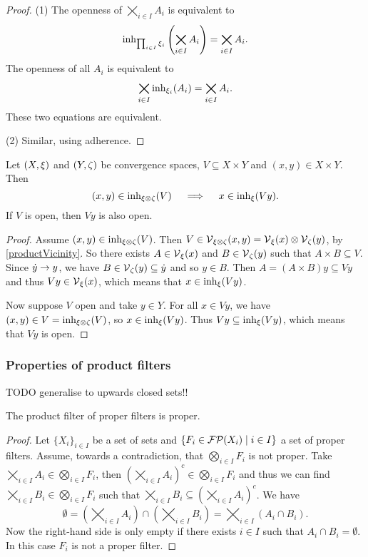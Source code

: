 \begin{proof}
(1) The openness of $\bigtimes_{i\in I}A_i$ is equivalent to 
\[\operatorname{inh}_{\prod_{i\in I}\xi_i}\left(\bigtimes_{i\in I}A_i\right) = \bigtimes_{i\in I}A_i. \]
The openness of all $A_i$ is equivalent to
\[\bigtimes_{i\in I}\operatorname{inh}_{\xi_i}(A_i) = \bigtimes_{i\in I}A_i. \]
These two equations are equivalent.

(2) Similar, using adherence.
\end{proof}

\begin{lemma} \label{sliceOpenSetOpen}
Let $\sSet{X,\xi}$ and $\sSet{Y,\zeta}$ be convergence spaces, $V\subseteq X\times Y$ and $(x,y)\in X\times Y$. Then
\[ (x,y) \in \operatorname{inh}_{\xi\otimes \zeta}(V) \quad \implies \quad x\in \operatorname{inh}_\xi(Vy). \]
If $V$ is open, then $Vy$ is also open.
\end{lemma}
\begin{proof}
Assume $(x,y) \in \operatorname{inh}_{\xi\otimes \zeta}(V)$. Then $V\in \operatorname{\mathcal{V}}_{\xi\otimes \zeta}(x,y) = \operatorname{\mathcal{V}}_\xi(x)\otimes \operatorname{\mathcal{V}}_\zeta(y)$, by \ref{productVicinity}. So there exists $A\in \operatorname{\mathcal{V}}_\xi(x)$ and $B \in \operatorname{\mathcal{V}}_\zeta(y)$ such that $A\times B\subseteq V$. Since $\dot{y} \to y$, we have $B\in\operatorname{\mathcal{V}}_\zeta(y)\subseteq \dot{y}$ and so $y\in B$. Then $A = (A\times B)y \subseteq Vy$ and thus $Vy\in \operatorname{\mathcal{V}}_\xi(x)$, which means that $x\in \operatorname{inh}_\xi(Vy)$.

Now suppose $V$ open and take $y\in Y$. For all $x\in Vy$, we have $(x,y) \in V = \operatorname{inh}_{\xi\otimes \zeta}(V)$, so $x\in \operatorname{inh}_\xi(Vy)$. Thus $Vy \subseteq \operatorname{inh}_\xi(Vy)$, which means that $Vy$ is open.
\end{proof}

\subsubsection{Properties of product filters}
TODO generalise to upwards closed sets!!

\begin{lemma}
The product filter of proper filters is proper.
\end{lemma}
\begin{proof}
Let $\{X_i\}_{i\in I}$ be a set of sets and $\setbuilder{F_i \in \powerfilters(X_i)}{i\in I}$ a set of proper filters. Assume, towards a contradiction, that $\bigotimes_{i\in I}F_i$ is not proper. Take $\bigtimes_{i\in I}A_i\in \bigotimes_{i\in I}F_i$, then $\left(\bigtimes_{i\in I}A_i\right)^c \in \bigotimes_{i\in I}F_i$ and thus we can find $\bigtimes_{i\in I}B_i\in \bigotimes_{i\in I}F_i$ such that $\bigtimes_{i\in I}B_i \subseteq \left(\bigtimes_{i\in I}A_i\right)^c$. We have
\[ \emptyset = \left(\bigtimes_{i\in I}A_i\right) \cap \left(\bigtimes_{i\in I}B_i\right) = \bigtimes_{i\in I}(A_i\cap B_i). \]
Now the right-hand side is only empty if there exists $i\in I$ such that $A_i\cap B_i = \emptyset$. In this case $F_i$ is not a proper filter.
\end{proof}

